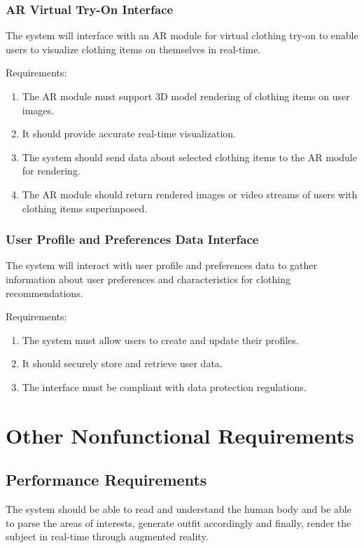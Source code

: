 		\subsubsection{AR Virtual Try-On Interface}
			The system will interface with an AR module for virtual clothing try-on to enable users to visualize clothing items on themselves in real-time.

			Requirements:
			\begin{enumerate}
				\item The AR module must support 3D model rendering of clothing items on user images.
				\item It should provide accurate real-time visualization.
				\item The system should send data about selected clothing items to the AR module for rendering.
				\item The AR module should return rendered images or video streams of users with clothing items superimposed.
			\end{enumerate}

		\subsubsection{User Profile and Preferences Data Interface}
			The system will interact with user profile and preferences data to gather information about user preferences and characteristics for clothing recommendations.

			Requirements:
			\begin{enumerate}
				\item The system must allow users to create and update their profiles.
				\item It should securely store and retrieve user data.
				\item The interface must be compliant with data protection regulations.
			\end{enumerate}

\section{Other Nonfunctional Requirements}
	\subsection{Performance Requirements}
		The system should be able to read and understand the human body and be able to parse the areas of interests, generate outfit accordingly and finally, render the subject in real-time through augmented reality.
		
